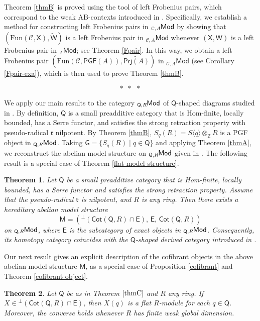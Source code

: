 \documentclass{amsart}
\newtheorem{intthm}{Theorem}[]
\theoremstyle{bfupright head,slanted body}
\theoremstyle{bfupright head,upright body}
\theoremstyle{fixed bf head,slanted body}
\theoremstyle{fixed bf head,upright body}
\theoremstyle{numbered paragraph}
\numberwithin{equation}{res}
\newcommand{\PGF}[1]{\mathsf{PGF}(#1)}
\newcommand{\Cot}[1]{\mathsf{Cot}(#1)}
\newcommand{\Mod}[1]{{_{#1}\mathsf{Mod}}}
\newcommand{\Prj}[1]{\mathsf{Prj}(#1)}
\newcommand{\Fun}{\mathrm{Fun}}
\newcommand{\E}{\mathsf{E}}
\newcommand{\G}{\mathsf{G}}
\newcommand{\X}{\mathsf{X}}
\newcommand{\W}{\mathsf{W}}
\newcommand{\ZZ}{\mathbb{Z}}
\newcommand{\C}{\mathcal{C}}
\newcommand{\Q}{\mathsf{Q}}
\newcommand{\lMod}[1]{{}_{#1}\mspace{-1mu}{\sf{Mod}}}
\begin{document}
Theorem \ref{thmB} is proved using the tool of left Frobenius pairs, which correspond to the weak AB-contexts introduced in \cite{MAsROB89}. Specifically, we establish a method for constructing left Frobenius pairs in $\lMod{\C,A}$ by showing that $(\Fun(\C,\X), \widetilde{\W})$ is a left Frobenius pair in $\Mod{\C,A}$ whenever $(\X, \W)$ is a left Frobenius pair in $\Mod{A}$; see Theorem \ref{Fpair}. In this way, we obtain a left Frobenius pair $(\Fun(\C,\PGF{A}), \widetilde{\Prj{A}})$ in $\Mod{\C,A}$ (see Corollary \ref{Fpair-exa}), which is then used to prove Theorem \ref{thmB}.

\begin{equation*}
  \ast \ \ \ast \ \ \ast
\end{equation*}

We apply our main results to the category $\lMod{\Q,R}$ of $\Q$-shaped diagrams studied in \cite{HJ21}. By definition, $\Q$ is a small preadditive category that is Hom-finite, locally bounded, has a Serre functor, and satisfies the strong retraction property with pseudo-radical $\mathfrak{r}$ nilpotent. By Theorem \ref{thmB}, $S_q(R)=S\langle q\rangle\otimes_\ZZ R$ is a PGF object in $\lMod{\Q,R}$. Taking $\G=\{S_{q}(R)\mid q\in \Q\}$ and applying Theorem \ref{thmA}, we reconstruct the abelian model structure on $\lMod{\Q,R}$ given in \cite{DLLM}. The following result is a special case of Theorem \ref{flat model structure}.


 \begin{intthm}\label{thmC}
Let $\Q$ be a small preadditive category that is Hom-finite, locally bounded, has a Serre functor and satisfies the strong retraction property. Assume that the pseudo-radical $\mathfrak{r}$ is nilpotent, and $R$ is any ring. Then there exists a hereditary abelian model structure
\[
{\mathsf M}=(^{\perp}(\Cot{\Q,R}\cap\E), \, \E, \, \Cot{\Q,R})
\]
on $\lMod{\Q,R}$, where $\E$ is the subcategory of exact objects in $\lMod{\Q,R}$. Consequently, its homotopy category coincides with the $\Q$-shaped derived category introduced in \cite[Corollary 2.8]{HJ21}.
 \end{intthm}

Our next result gives an explicit description of the cofibrant objects in the above abelian model structure ${\mathsf M}$, as a special case of Proposition \ref{cofibrant} and Theorem \ref{cofibrant object}.

\begin{intthm}\label{thmD}
Let $\Q$ be as in Theorem $\ref{thmC}$ and $R$ any ring. If $X\in{^\perp(\Cot{\Q,R}\cap\E)}$, then $X(q)$ is a flat $R$-module for each $q\in\Q$. Moreover, the converse holds whenever $R$ has finite weak global dimension.
\end{intthm}
\end{document}
